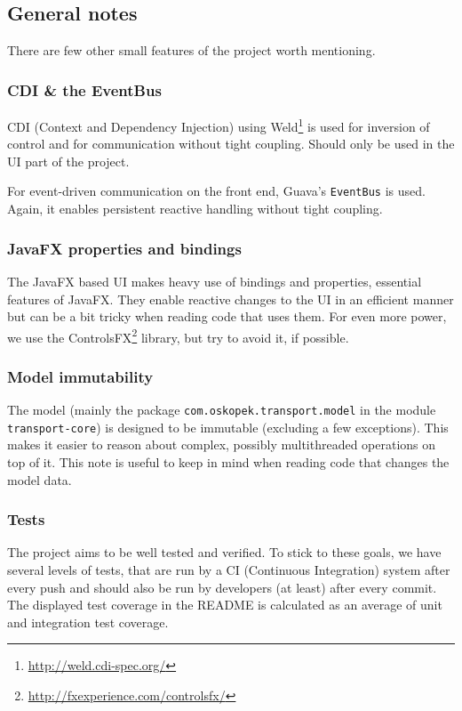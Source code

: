 \subsection*{General notes}
There are few other small features of the project worth mentioning.

\subsubsection*{CDI \& the EventBus}
CDI (Context and Dependency Injection) using Weld\footnote{\url{http://weld.cdi-spec.org/}} is used for inversion of control
and for communication without tight coupling. Should only be used in the UI part of the project.

For event-driven communication on the front end, Guava's \texttt{EventBus} is used. Again, it enables persistent
reactive handling without tight coupling.

\subsubsection*{JavaFX properties and bindings}
The JavaFX based UI makes heavy use of bindings and properties, essential features of JavaFX. They enable
reactive changes to the UI in an efficient manner but can be a bit tricky when reading code that uses them.
For even more power, we use the ControlsFX\footnote{\url{http://fxexperience.com/controlsfx/}} library, but try to avoid it,
if possible.

\subsubsection*{Model immutability}
The model (mainly the package \texttt{com.oskopek.transport.model} in the module \verb+transport-core+) is designed to be immutable
(excluding a few exceptions). This makes it easier to reason about complex, possibly multithreaded operations
on top of it. This note is useful to keep in mind when reading code that changes the model data.

\subsubsection*{Tests}
The project aims to be well tested and verified. To stick to these goals, we have several levels of tests,
that are run by a CI (Continuous Integration) system after every push and should also be run by developers
(at least) after every commit. The displayed test coverage in the README is calculated as an average of unit
and integration test coverage.

